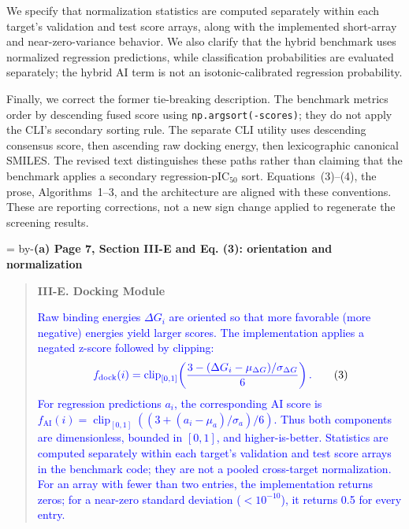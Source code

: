 \documentclass[11pt]{article}
\newenvironment{excerpt}{\begin{quote}\small\sloppy}{\end{quote}}
\newcommand{\roomfor}[1]{\par\begingroup\dimen0=\pagegoal\advance\dimen0 by-\pagetotal\ifdim\dimen0<#1\baselineskip\newpage\fi\endgroup}
\newcommand{\loc}[1]{\roomfor{7}\medskip\noindent\textbf{#1}\par\smallskip}
\newcommand{\mshead}[2]{\par\noindent\textbf{#1. #2}\par\smallskip}
\begin{document}
We specify that normalization statistics are computed separately within
each target's validation and test score arrays, along with the implemented
short-array and near-zero-variance behavior. We also clarify that the
hybrid benchmark uses normalized regression predictions, while
classification probabilities are evaluated separately; the hybrid AI term
is not an isotonic-calibrated regression probability.

Finally, we correct the former tie-breaking description. The benchmark
metrics order by descending fused score using \texttt{np.argsort(-scores)};
they do not apply the CLI's secondary sorting rule. The separate CLI
utility uses descending consensus score, then ascending raw docking energy,
then lexicographic canonical SMILES. The revised text distinguishes these
paths rather than claiming that the benchmark applies a secondary
regression-pIC$_{50}$ sort. Equations~(3)--(4), the prose, Algorithms~1--3,
and the architecture are aligned with these conventions. These are reporting
corrections, not a new sign change applied to regenerate the screening results.

\loc{(a) Page 7, Section III-E and Eq. (3): orientation and normalization}
\begin{excerpt}
\mshead{III-E}{Docking Module}

\textcolor{blue}{Raw binding energies $\Delta G_i$ are oriented so that
more favorable (more negative) energies yield larger scores. The
implementation applies a negated z-score followed by clipping:}
\begin{equation}
\textcolor{blue}{f_{\mathrm{dock}}(i)
 = \operatorname{clip}_{[0,1]}\!\left(
 \frac{3-(\Delta G_i-\mu_{\Delta G})/\sigma_{\Delta G}}{6}\right).}
\tag{3}
\end{equation}
\textcolor{blue}{For regression predictions $a_i$, the corresponding
AI score is $f_{\mathrm{AI}}(i)=\operatorname{clip}_{[0,1]}
((3+(a_i-\mu_a)/\sigma_a)/6)$. Thus both components are
dimensionless, bounded in $[0,1]$, and higher-is-better. Statistics
are computed separately within each target's validation and test
score arrays in the benchmark code; they are not a pooled
cross-target normalization. For an array with fewer than two entries,
the implementation returns zeros; for a near-zero standard deviation
($<10^{-10}$), it returns 0.5 for every entry.}
\end{excerpt}
\end{document}
